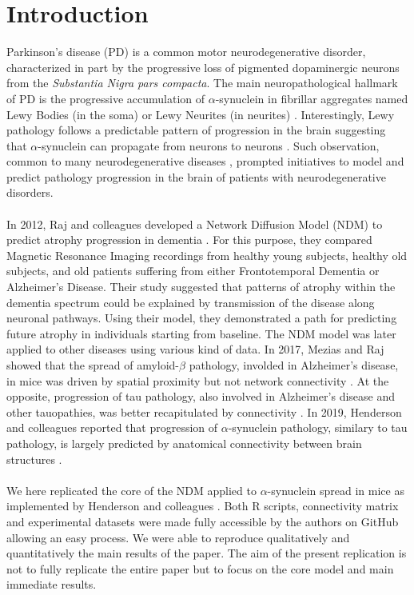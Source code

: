 \section{Introduction}

Parkinson's disease (PD) is a common motor neurodegenerative disorder, characterized in part by the progressive loss of pigmented dopaminergic neurons from the \textit{Substantia Nigra pars compacta}. The main neuropathological hallmark of PD is the progressive accumulation of $\alpha$-synuclein in fibrillar aggregates named Lewy Bodies (in the soma) or Lewy Neurites (in neurites) \cite{Dehay_2015}. Interestingly, Lewy pathology follows a predictable pattern of progression in the brain suggesting that $\alpha$-synuclein can propagate from neurons to neurons \cite{Braak_2003}. Such observation, common to many neurodegenerative diseases \cite{Jucker_2018}, prompted initiatives to model and predict pathology progression in the brain of patients with neurodegenerative disorders. \\
\\
In 2012, Raj and colleagues developed a Network Diffusion Model (NDM) to predict atrophy progression in dementia \cite{Raj_2012}. For this purpose, they compared Magnetic Resonance Imaging recordings from healthy young subjects, healthy old subjects, and old patients suffering from either Frontotemporal Dementia or Alzheimer's Disease. Their study suggested that patterns of atrophy within the dementia spectrum could be explained by transmission of the disease along neuronal pathways. Using their model, they demonstrated a path for predicting future atrophy in individuals starting from baseline. The NDM model was later applied to other diseases using various kind of data. In 2017, Mezias and Raj showed that the spread of amyloid-$\beta$ pathology, involded in Alzheimer's disease, in mice was driven by spatial proximity but not network connectivity \cite{Mezias_2017_abeta}. At the opposite, progression of tau pathology, also involved in Alzheimer's disease and other tauopathies, was better recapitulated by connectivity \cite{Mezias_2017_tau}. In 2019, Henderson and colleagues reported that progression of $\alpha$-synuclein pathology, similary to tau pathology, is largely predicted by anatomical connectivity between brain structures \cite{Henderson_2019}. \\
\\
We here replicated the  core of the NDM applied to $\alpha$-synuclein spread in mice as implemented by Henderson and colleagues \cite{Henderson_2019}. Both R scripts, connectivity matrix and experimental datasets were made fully accessible by the authors on GitHub allowing an easy process. We were able to reproduce qualitatively and quantitatively the main results of the paper. The aim of the present replication is not to fully replicate the entire paper but to focus on the core model and main immediate results.\\
\\
